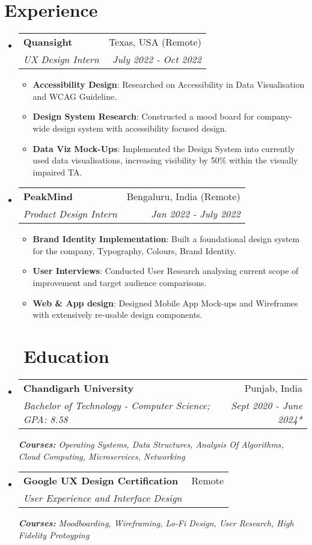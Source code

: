 \documentclass[a4paper,20pt]{article}
\makeatletter
\newcommand{\resumeItem}[2]{
  \item\small{
    \textbf{#1}{: #2 \vspace{-2pt}}
  }
}
\newcommand{\resumeSubheading}[4]{
  \vspace{-1pt}\item
    \begin{tabular*}{0.97\textwidth}{l@{\extracolsep{\fill}}r}
      \textbf{#1} & #2 \\
      \textit{#3} & \textit{#4} \\
    \end{tabular*}\vspace{-5pt}
}
\newcommand{\resumeSubHeadingListStart}{\begin{itemize}[leftmargin=*]}
\newcommand{\resumeSubHeadingListEnd}{\end{itemize}}
\newcommand{\resumeItemListStart}{\begin{itemize}}
\newcommand{\resumeItemListEnd}{\end{itemize}\vspace{-5pt}}
\makeatother
\begin{document}
\section{Experience}
  \resumeSubHeadingListStart
    \resumeSubheading{Quansight}{Texas, USA (Remote)}
    {UX Design Intern}{July 2022 - Oct 2022}
    \resumeItemListStart
        \resumeItem{Accessibility Design}
          {Researched on Accessibility in Data Visualisation and WCAG Guideline.}
          \resumeItem{Design System Research}
          {Constructed a mood board for company-wide design system with accessibility focused design.}
          \resumeItem{Data Viz Mock-Ups}{Implemented the Design System into currently used data visualisations, increasing visibility by 50\% within the visually impaired TA.}
      \resumeItemListEnd
\vspace{-5pt}
    \resumeSubheading
		{PeakMind}{Bengaluru, India (Remote)}
		{Product Design Intern}{Jan 2022 -  July 2022}
		\resumeItemListStart
        \resumeItem{Brand Identity Implementation}
          {Built a foundational design system for the company, Typography, Colours, Brand Identity.}
        \resumeItem{User Interviews}
          {Conducted User Research analysing current scope of improvement and target audience comparisons.}
        \resumeItem{Web \& App design}{Designed Mobile App Mock-ups and Wireframes with extensively re-usable design components.}
		\resumeItemListEnd

\resumeSubHeadingListEnd

\section{~~Education}
  \resumeSubHeadingListStart
    \resumeSubheading
      {Chandigarh University}{Punjab, India}
      {Bachelor of Technology - Computer Science;  GPA: 8.58}{Sept 2020 - June 2024*}
      {\scriptsize \textit{ \footnotesize{\newline{}\textbf{Courses:} Operating Systems, Data Structures, Analysis Of Algorithms, Cloud Computing, Microservices, Networking}}}
      \resumeSubheading
      {Google UX Design Certification}{Remote}
      {User Experience and Interface Design}{}
      {\scriptsize \textit{ \footnotesize{\newline{}\textbf{Courses:} Moodboarding, Wireframing, Lo-Fi Design, User Research, High Fidelity Protoyping}}}
    \resumeSubHeadingListEnd
	    
\vspace{-5pt}
\end{document}
